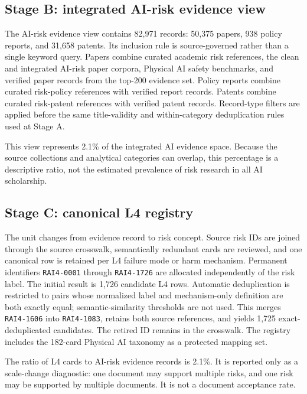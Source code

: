 \documentclass[11pt,a4paper]{article}
\newcommand{\code}[1]{\texttt{#1}}
\begin{document}
\subsection{Stage B: integrated AI-risk evidence view}

The AI-risk evidence view contains 82,971 records: 50,375 papers, 938 policy
reports, and 31,658 patents. Its inclusion rule is source-governed rather than a
single keyword query. Papers combine curated academic risk references, the
clean and integrated AI-risk paper corpora, Physical AI safety benchmarks, and
verified paper records from the top-200 evidence set. Policy reports combine
curated risk-policy references with verified report records. Patents combine
curated risk-patent references with verified patent records. Record-type filters
are applied before the same title-validity and within-category deduplication
rules used at Stage A.

This view represents 2.1\% of the integrated AI evidence space. Because the
source collections and analytical categories can overlap, this percentage is a
descriptive ratio, not the estimated prevalence of risk research in all AI
scholarship.

\subsection{Stage C: canonical L4 registry}

The unit changes from evidence record to risk concept. Source risk IDs are
joined through the source crosswalk, semantically redundant cards are reviewed,
and one canonical row is retained per L4 failure mode or harm mechanism.
Permanent identifiers \code{RAI4-0001} through \code{RAI4-1726} are allocated
independently of the risk label. The initial result is 1,726 candidate L4 rows. Automatic
deduplication is restricted to pairs whose normalized label and mechanism-only
definition are both exactly equal; semantic-similarity thresholds are not used.
This merges \code{RAI4-1606} into \code{RAI4-1083}, retains both source references,
and yields 1,725 exact-deduplicated candidates. The retired ID remains in the
crosswalk. The registry includes the 182-card Physical AI taxonomy as a
protected mapping set.

The ratio of L4 cards to AI-risk evidence records is 2.1\%. It is reported only
as a scale-change diagnostic: one document may support multiple risks, and one
risk may be supported by multiple documents. It is not a document acceptance
rate.
\end{document}
